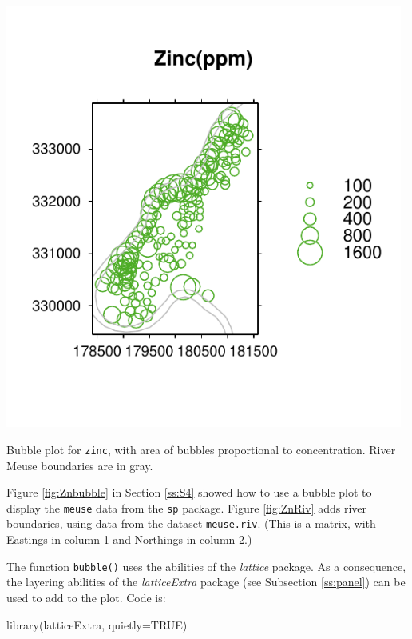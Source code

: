 \documentclass{tufte-book}\usepackage[]{graphicx}\usepackage[]{color}
\newcommand{\txtt}[1]{\texttt{#1}}
\newcommand{\margtt}[1]{{\footnotesize \texttt{#1}}}
\begin{document}
\begin{marginfigure}
\begin{Schunk}


\centerline{\includegraphics[width=0.98\textwidth]{figs/13-meuse-bubble-1} }

\end{Schunk}
\vspace*{-15pt}
 \caption{Bubble plot for \margtt{zinc},
with area of bubbles proportional to concentration.
River Meuse boundaries are in gray.\label{fig:ZnRiv}}
\end{marginfigure}

Figure \ref{fig:Znbubble} in Section \ref{ss:S4} showed how to use a
bubble plot to display the \txtt{meuse} data from the \txtt{sp}
package.  Figure \ref{fig:ZnRiv} adds river boundaries, using data from the
dataset \txtt{meuse.riv}.  (This is a matrix, with Eastings in column
1 and Northings in column 2.)

The function \txtt{bubble()} uses the abilities of the {\em lattice}
package. As a consequence, the layering abilities of the {\em
  latticeExtra} package (see Subsection \ref{ss:panel}) can be used to
add to the plot. Code is:
\begin{Schunk}
\begin{Sinput}
library(latticeExtra, quietly=TRUE)
\end{Sinput}
\end{Schunk}
\end{document}
